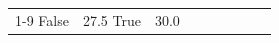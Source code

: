 \begin{table}[H]
\begin{tabular}{lllrlllll}
\cline{1-9}
False & 27.5%
\cline{1-9}
True & 30.0%

\end{tabular}
\end{table}
